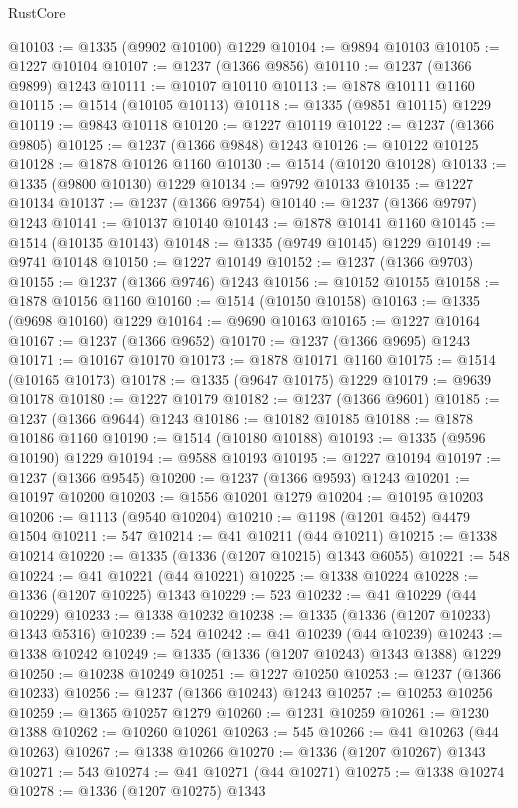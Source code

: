 \begin{lexlean}{RustCore}
\begin{coremodule}
@10103 := @1335 (@9902 @10100) @1229
@10104 := @9894 @10103
@10105 := @1227 @10104
@10107 := @1237 (@1366 @9856)
@10110 := @1237 (@1366 @9899) @1243
@10111 := @10107 @10110
@10113 := @1878 @10111 @1160
@10115 := @1514 (@10105 @10113)
@10118 := @1335 (@9851 @10115) @1229
@10119 := @9843 @10118
@10120 := @1227 @10119
@10122 := @1237 (@1366 @9805)
@10125 := @1237 (@1366 @9848) @1243
@10126 := @10122 @10125
@10128 := @1878 @10126 @1160
@10130 := @1514 (@10120 @10128)
@10133 := @1335 (@9800 @10130) @1229
@10134 := @9792 @10133
@10135 := @1227 @10134
@10137 := @1237 (@1366 @9754)
@10140 := @1237 (@1366 @9797) @1243
@10141 := @10137 @10140
@10143 := @1878 @10141 @1160
@10145 := @1514 (@10135 @10143)
@10148 := @1335 (@9749 @10145) @1229
@10149 := @9741 @10148
@10150 := @1227 @10149
@10152 := @1237 (@1366 @9703)
@10155 := @1237 (@1366 @9746) @1243
@10156 := @10152 @10155
@10158 := @1878 @10156 @1160
@10160 := @1514 (@10150 @10158)
@10163 := @1335 (@9698 @10160) @1229
@10164 := @9690 @10163
@10165 := @1227 @10164
@10167 := @1237 (@1366 @9652)
@10170 := @1237 (@1366 @9695) @1243
@10171 := @10167 @10170
@10173 := @1878 @10171 @1160
@10175 := @1514 (@10165 @10173)
@10178 := @1335 (@9647 @10175) @1229
@10179 := @9639 @10178
@10180 := @1227 @10179
@10182 := @1237 (@1366 @9601)
@10185 := @1237 (@1366 @9644) @1243
@10186 := @10182 @10185
@10188 := @1878 @10186 @1160
@10190 := @1514 (@10180 @10188)
@10193 := @1335 (@9596 @10190) @1229
@10194 := @9588 @10193
@10195 := @1227 @10194
@10197 := @1237 (@1366 @9545)
@10200 := @1237 (@1366 @9593) @1243
@10201 := @10197 @10200
@10203 := @1556 @10201 @1279
@10204 := @10195 @10203
@10206 := @1113 (@9540 @10204)
@10210 := @1198 (@1201 @452) @4479 @1504
@10211 := 547
@10214 := @41 @10211 (@44 @10211)
@10215 := @1338 @10214
@10220 := @1335 (@1336 (@1207 @10215) @1343 @6055)
@10221 := 548
@10224 := @41 @10221 (@44 @10221)
@10225 := @1338 @10224
@10228 := @1336 (@1207 @10225) @1343
@10229 := 523
@10232 := @41 @10229 (@44 @10229)
@10233 := @1338 @10232
@10238 := @1335 (@1336 (@1207 @10233) @1343 @5316)
@10239 := 524
@10242 := @41 @10239 (@44 @10239)
@10243 := @1338 @10242
@10249 := @1335 (@1336 (@1207 @10243) @1343 @1388) @1229
@10250 := @10238 @10249
@10251 := @1227 @10250
@10253 := @1237 (@1366 @10233)
@10256 := @1237 (@1366 @10243) @1243
@10257 := @10253 @10256
@10259 := @1365 @10257 @1279
@10260 := @1231 @10259
@10261 := @1230 @1388
@10262 := @10260 @10261
@10263 := 545
@10266 := @41 @10263 (@44 @10263)
@10267 := @1338 @10266
@10270 := @1336 (@1207 @10267) @1343
@10271 := 543
@10274 := @41 @10271 (@44 @10271)
@10275 := @1338 @10274
@10278 := @1336 (@1207 @10275) @1343

\end{coremodule}
\end{lexlean}
